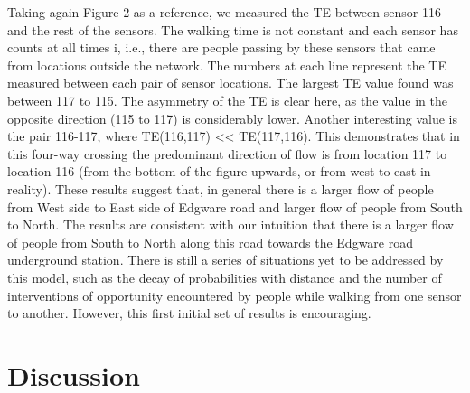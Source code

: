 Taking again Figure 2 as a reference, we measured the TE between sensor 116 and the rest of the sensors. The walking time is not constant and each sensor has counts at all times i, i.e., there are people passing by these sensors that came from locations outside the network. The numbers at each line represent the TE measured between each pair of sensor locations. The largest TE value found was between 117 to 115. The asymmetry of the TE is clear here, as the value in the opposite direction (115 to 117) is considerably lower. Another interesting value is the pair 116-117, where TE(116,117) << TE(117,116). This demonstrates that in this four-way crossing the predominant direction of flow is from location 117 to location 116 (from the bottom of the figure upwards, or from west to east in reality). These results suggest that, in general there is a larger flow of people from West side to East side of Edgware road and larger flow of people from South to North. The results are consistent with our intuition that there is a larger flow of people from South to North along this road towards the Edgware road underground station.  
There is still a series of situations yet to be addressed by this model, such as the decay of probabilities with distance and the number of interventions of opportunity encountered by people while walking from one sensor to another. However, this first initial set of results is encouraging.  


\section{Discussion}


